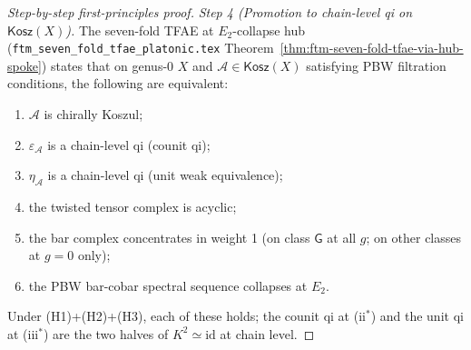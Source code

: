 \documentclass[11pt]{article}
\theoremstyle{definition}
\newcommand{\Kosz}{\mathsf{Kosz}}
\newcommand{\id}{\mathrm{id}}
\newcommand{\cA}{\mathcal{A}}
\begin{document}
\begin{proof}[Step-by-step first-principles proof]
\emph{Step 4 (Promotion to chain-level qi on $\Kosz(X)$).}
The seven-fold TFAE at $E_2$-collapse hub
(\texttt{ftm\_seven\_fold\_tfae\_platonic.tex}
Theorem~\ref{thm:ftm-seven-fold-tfae-via-hub-spoke}) states that on
genus-0 $X$ and $\cA\in\Kosz(X)$ satisfying PBW filtration
conditions, the following are equivalent:
\begin{enumerate}[label=\textup{(\roman*$^*$)}]
\item $\cA$ is chirally Koszul;
\item $\varepsilon_\cA$ is a chain-level qi (counit qi);
\item $\eta_\cA$ is a chain-level qi (unit weak equivalence);
\item the twisted tensor complex is acyclic;
\item the bar complex concentrates in weight 1 (on class $\mathsf{G}$
at all $g$; on other classes at $g=0$ only);
\item the PBW bar-cobar spectral sequence collapses at $E_2$.
\end{enumerate}
Under (H1)+(H2)+(H3), each of these holds; the counit qi at (ii$^*$)
and the unit qi at (iii$^*$) are the two halves of $K^{2}\simeq\id$
at chain level.


\end{proof}
\end{document}
